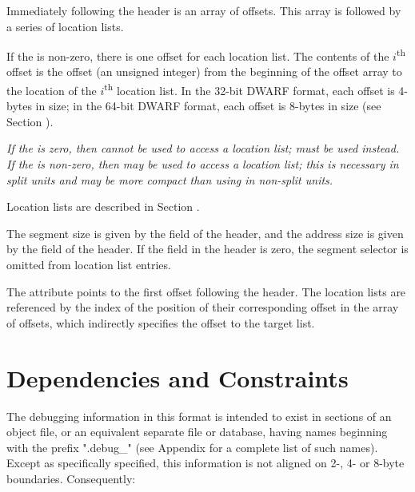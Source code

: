 Immediately following the header is an array of offsets.
This array is followed by a series of location lists. 

If the \HFNoffsetentrycount{} is non-zero, there 
is one offset for each location list. The contents
of the $i$\textsuperscript{th} offset is the offset 
(an unsigned integer) from the
beginning of the offset array to the location of the 
$i$\textsuperscript{th} location list. 
In the 32-bit DWARF format, each offset is 4-bytes in size; 
in the 64-bit DWARF format, each offset is 8-bytes in size 
(see Section ).

\textit{
If the \HFNoffsetentrycount{} is zero, then \DWFORMloclistx{} cannot 
be used to access a location list; \DWFORMsecoffset{} must be used 
instead. If the \HFNoffsetentrycount{} is non-zero, then \DWFORMloclistx{} 
may be used to access a location list; this is necessary in split units and
may be more compact than using \DWFORMsecoffset{}
\bb\eb
in non-split units.}

Location lists are
described in Section .

The segment size is given by the
\HFNsegmentselectorsize{} field of the header, and the address size is
given by the \HFNaddresssize{} field of the header. If the
\HFNsegmentselectorsize{} field in the header is zero, the segment
selector is omitted from location list entries.

The \DWATloclistsbase{} attribute points to the first offset 
following the header. The location lists are referenced
by the index of the position of their corresponding offset in the
array of offsets, which indirectly specifies the offset to the
target list.

\section{Dependencies and Constraints}
\label{datarep:dependenciesandconstraints}
The debugging information in this format is intended to
exist in sections of an object file, or an equivalent
separate file or database, having names beginning with
the prefix ".debug\_" (see Appendix 
for a complete list of such names). 
Except as specifically specified, this information is not 
aligned on 2-, 4- or 8-byte boundaries. Consequently:


